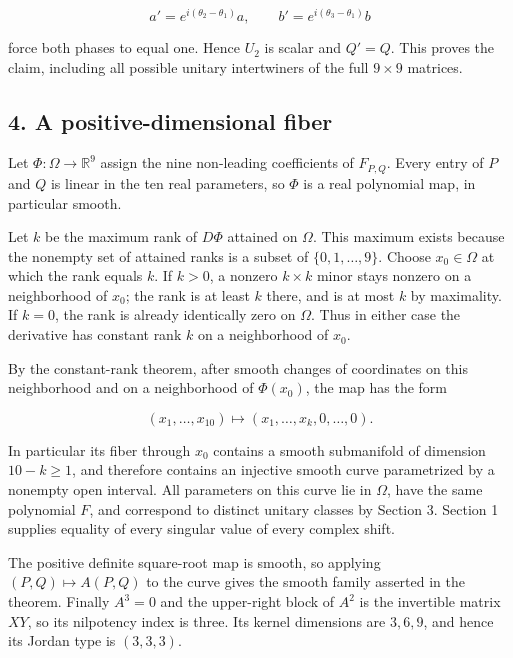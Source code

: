 \documentclass[10pt,a4paper]{article}
\begin{document}
\nopagebreak[4]
\[
a'=e^{i(\theta_2-\theta_1)}a,\qquad
b'=e^{i(\theta_3-\theta_1)}b
\]

force both phases to equal one. Hence \(U_2\) is scalar and \(Q'=Q\).
This proves the claim, including all possible unitary intertwiners of
the full \(9\times9\) matrices.

\subsection{4. A positive-dimensional
fiber}\label{a-positive-dimensional-fiber}

Let \(\Phi:\Omega\to\mathbb R^9\) assign the nine non-leading
coefficients of \(F_{P,Q}\). Every entry of \(P\) and \(Q\) is linear in
the ten real parameters, so \(\Phi\) is a real polynomial map, in
particular smooth.

Let \(k\) be the maximum rank of \(D\Phi\) attained on \(\Omega\). This
maximum exists because the nonempty set of attained ranks is a subset of
\(\{0,1,\ldots,9\}\). Choose \(x_0\in\Omega\) at which the rank equals
\(k\). If \(k>0\), a nonzero \(k\times k\) minor stays nonzero on a
neighborhood of \(x_0\); the rank is at least \(k\) there, and is at
most \(k\) by maximality. If \(k=0\), the rank is already identically
zero on \(\Omega\). Thus in either case the derivative has constant rank
\(k\) on a neighborhood of \(x_0\).

By the constant-rank theorem, after smooth changes of coordinates on
this neighborhood and on a neighborhood of \(\Phi(x_0)\), the map has
the form

\nopagebreak[4]
\[
(x_1,\ldots,x_{10})\longmapsto(x_1,\ldots,x_k,0,\ldots,0).
\]

In particular its fiber through \(x_0\) contains a smooth submanifold of
dimension \(10-k\geq1\), and therefore contains an injective smooth
curve parametrized by a nonempty open interval. All parameters on this
curve lie in \(\Omega\), have the same polynomial \(F\), and correspond
to distinct unitary classes by Section 3. Section 1 supplies equality of
every singular value of every complex shift.

The positive definite square-root map is smooth, so applying
\((P,Q)\mapsto A(P,Q)\) to the curve gives the smooth family asserted in
the theorem. Finally \(A^3=0\) and the upper-right block of \(A^2\) is
the invertible matrix \(XY\), so its nilpotency index is three. Its
kernel dimensions are \(3,6,9\), and hence its Jordan type is
\((3,3,3)\).
\end{document}
